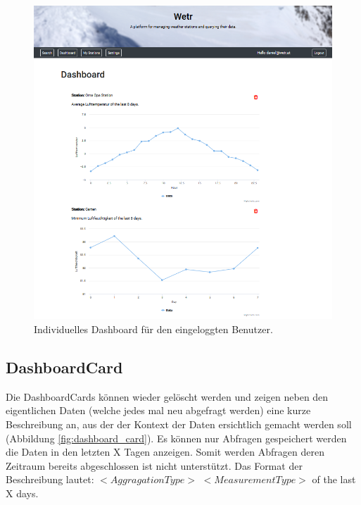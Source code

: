 \documentclass[12pt, letterpaper]{article}
\begin{document}
\begin{figure}[H]
    \centering
    \includegraphics[width=\textwidth]{img/dashboard/dashboard.png}
    \caption{Individuelles Dashboard für den eingeloggten Benutzer.}
    \label{fig:dashboard}
\end{figure}
\newpage

\subsection{DashboardCard}
\label{dashboardcards}

Die DashboardCards können wieder gelöscht werden und zeigen neben den eigentlichen Daten (welche jedes mal neu abgefragt werden) eine kurze Beschreibung an, aus der der Kontext der Daten ersichtlich gemacht werden soll (Abbildung \ref{fig:dashboard_card}). Es können nur Abfragen gespeichert werden die Daten in den letzten X Tagen anzeigen. Somit werden Abfragen deren Zeitraum bereits abgeschlossen ist nicht unterstützt. Das Format der Beschreibung lautet: $<AggragationType>$ $<MeasurementType>$ of the last X days.
\end{document}
